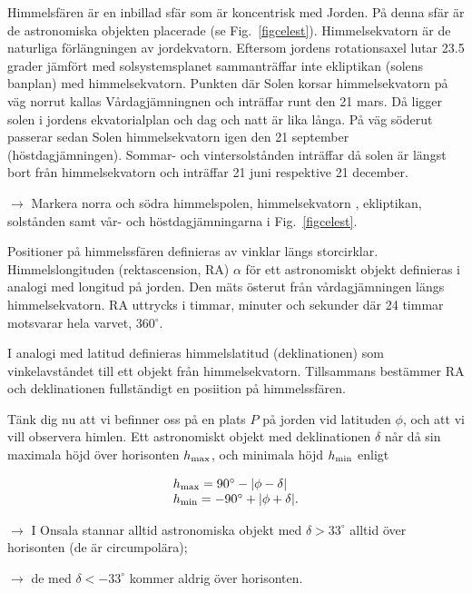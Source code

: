 Himmelsfären är en inbillad sfär som är koncentrisk med Jorden. På
denna sfär är de astronomiska objekten placerade (se
Fig.~\ref{figcelest}). Himmelsekvatorn är de naturliga förlängningen
av jordekvatorn. Eftersom jordens rotationsaxel lutar 23.5 grader
jämfört med solsystemsplanet sammanträffar inte ekliptikan (solens
banplan) med himmelsekvatorn. Punkten där Solen korsar himmelsekvatorn
på väg norrut kallas Vårdagjämningnen och inträffar runt den 21
mars. Då ligger solen i jordens ekvatorialplan och dag och natt är
lika långa. På väg söderut passerar sedan Solen himmelsekvatorn igen
den 21 september (höstdagjämningen). Sommar- och vintersolstånden
inträffar då solen är längst bort från himmelsekvatorn och inträffar
21 juni respektive 21 december.

\medskip
{{$\rightarrow$ Markera norra och södra himmelspolen,
    himmelsekvatorn , ekliptikan, solstånden samt vår- och
    höstdagjämningarna i Fig.~\ref{figcelest}.}}
\medskip

Positioner på himmelssfären definieras av vinklar längs
storcirklar. Himmelslongituden (rektascension, RA) $\alpha$ för ett
astronomiskt objekt definieras i analogi med longitud på jorden. Den
mäts österut från vårdagjämningen längs himmelsekvatorn. RA uttrycks i
timmar, minuter och sekunder där 24 timmar motsvarar hela varvet,
360$^\circ$.

I analogi med latitud definieras himmelslatitud (deklinationen) som
vinkelavståndet till ett objekt från himmelsekvatorn. Tillsammans
bestämmer RA och deklinationen fullständigt en posiition på
himmelssfären.

Tänk dig nu att vi befinner oss på en plats $P$ på jorden vid
latituden $\phi$, och att vi vill observera himlen. Ett astronomiskt
objekt med deklinationen $\delta$ når då sin maximala höjd över
horisonten $h_{\rm max}$, och minimala höjd $h_{\rm min}$ enligt

\begin{equation}
\begin{array}{l}
h_{\rm max} = 90^\circ -|\phi-\delta| \\
h_{\rm min} = -90^\circ +|\phi+\delta|. 
\end{array}
\end{equation}

{{$\rightarrow$ I Onsala stannar alltid astronomiska
    objekt med $\delta > 33^\circ$ 
alltid över horisonten (de är circumpolära); }}

{{$\rightarrow$ de med $\delta < -33^\circ$ kommer aldrig
    över horisonten.}}


